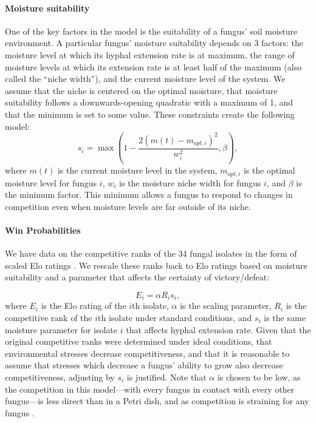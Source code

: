 \documentclass[12pt]{article}
\begin{document}
\paragraph{Moisture suitability} One of the key factors in the model is the suitability of a fungus' soil moisture environment. A particular fungus' moisture suitability depends on 3 factors: the moisture level at which its hyphal extension rate is at maximum, the range of moisture levels at which its extension rate is at least half of the maximum (also called the ``niche width''), and the current moisture level of the system. We assume that the niche is centered on the optimal moisture, that moisture suitability follows a downwards-opening quadratic with a maximum of 1, and that the minimum is set to some value. These constraints create the following model:
\begin{equation}\label{eq:suitability}
s_i=\max\left(1-\frac{2(m(t)-m_{opt,i})^2}{w_i^2},\beta\right),
\end{equation}
where $m(t)$ is the current moisture level in the system, $m_{opt,i}$ is the optimal moisture level for fungus $i$, $w_i$ is the moisture niche width for fungus $i$, and $\beta$ is the minimum factor. This minimum allows a fungus to respond to changes in competition even when moisture levels are far outside of its niche.

\paragraph{Win Probabilities}
We have data on the competitive ranks of the 34 fungal isolates in the form of scaled Elo ratings \cite{consistent_tradeoffs}. We rescale these ranks back to Elo ratings based on moisture suitability and a parameter that affects the certainty of victory/defeat:

\begin{equation*}
E_i=\alpha R_i s_i,
\end{equation*}
where $E_i$ is the Elo rating of the $i$th isolate, $\alpha$ is the scaling parameter, $R_i$ is the competitive rank of the $i$th isolate under standard conditions, and $s_i$ is the same moisture parameter for isolate $i$ that affects hyphal extension rate. Given that the original competitive ranks were determined under ideal conditions, that environmental stresses decrease competitiveness, and that it is reasonable to assume that stresses which decrease a fungus' ability to grow also decrease competitiveness, adjusting by $s_i$ is justified. Note that $\alpha$ is chosen to be low, as the competition in this model---with every fungus in contact with every other fungus---is less direct than in a Petri dish, and as competition is straining for any fungus \cite{combat}.
\end{document}
